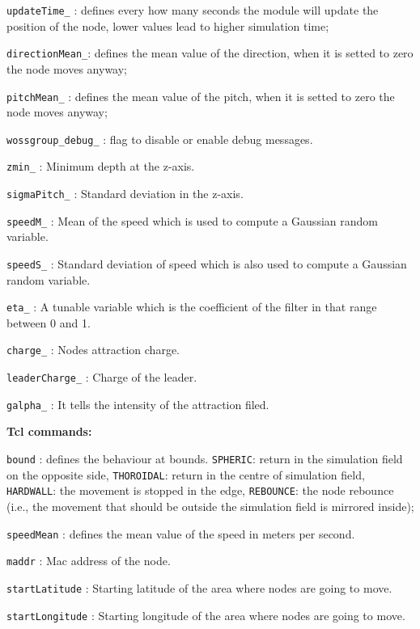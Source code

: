 \begin{description}
\begin{description}
      \item {\tt updateTime\_} : defines every how many seconds the module will update the position of the node, lower values lead to higher simulation time;
      \item {\tt directionMean\_}: defines the mean value of the direction, when it is setted to zero the node moves anyway;
      \item {\tt pitchMean\_} : defines the mean value of the pitch, when it is setted to zero the node moves anyway;
      \item {\tt wossgroup\_debug\_} : flag to disable or enable debug messages.
      \item {\tt zmin\_} : Minimum depth at the z-axis.
      \item {\tt sigmaPitch\_} : Standard deviation in the z-axis.
      \item {\tt speedM\_} : Mean of the speed which is used to compute a Gaussian random variable.
      \item {\tt speedS\_} : Standard deviation of speed which is also used to compute a Gaussian random variable.
      \item {\tt eta\_} : A tunable variable which is the coefficient of the filter in that range between 0 and 1.
      \item {\tt charge\_} : Nodes attraction charge.
      \item {\tt leaderCharge\_} : Charge of the leader. 
      \item {\tt galpha\_} : It tells the intensity of the attraction filed.
    \end{description}
   \item {\bf Tcl commands:}
    \begin{description}
      \item {\tt bound} : defines the behaviour at bounds. {\tt SPHERIC}: return in the simulation field on the opposite side, {\tt THOROIDAL}: return in the centre of simulation field, {\tt HARDWALL}: the movement is stopped in the edge, {\tt REBOUNCE}: the node rebounce (i.e., the movement that should be outside the simulation field is mirrored inside);
      \item {\tt speedMean} : defines the mean value of the speed in meters per second.
      \item {\tt maddr} : Mac address of the node. 
      \item {\tt startLatitude} : Starting latitude of the area where nodes are going to move. 
      \item {\tt startLongitude} : Starting longitude of the area where nodes are going to move. 

\end{description}
\end{description}
